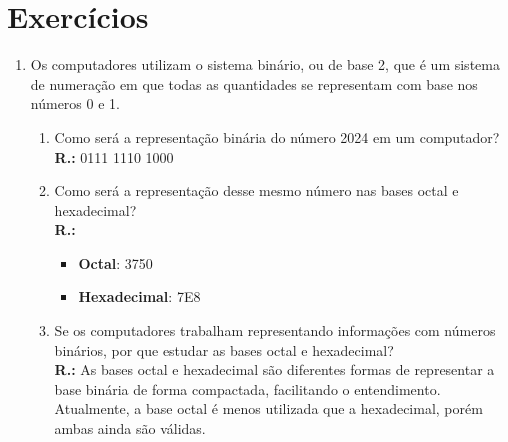 \documentclass{article}[12pt]
\begin{document}
\section*{Exercícios}

\begin{enumerate}
    \item Os computadores utilizam o sistema binário, ou de base 2, que é um sistema de numeração em que todas as quantidades se representam com base nos números 0 e 1.
    \begin{enumerate}
        \item Como será a representação binária do número 2024 em um computador? \\
        \textbf{R.:} 0111 1110 1000
        
        \item Como será a representação desse mesmo número nas bases octal e hexadecimal? \\
        \textbf{R.:} 
        \begin{itemize}
            \item \textbf{Octal}: 3750
            \item \textbf{Hexadecimal}: 7E8
        \end{itemize}
        
        \item Se os computadores trabalham representando informações com números binários, por que estudar as bases octal e hexadecimal? \\
        \textbf{R.:} As bases octal e hexadecimal são diferentes formas de representar a base binária de forma compactada, facilitando o entendimento. Atualmente, a base octal é menos utilizada que a hexadecimal, porém ambas ainda são válidas.
    \end{enumerate}
    

\end{enumerate}
\end{document}
